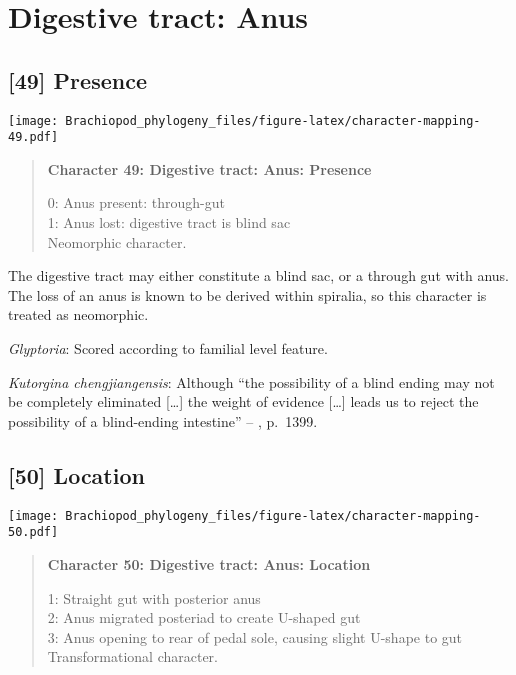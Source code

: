 \documentclass[openany]{book}
\theoremstyle{definition}
\theoremstyle{definition}
\theoremstyle{definition}
\theoremstyle{remark}
\begin{document}
\section{Digestive tract: Anus}\label{digestive-tract-anus}

\subsection*{{[}49{]} Presence}\label{presence-2}

\texttt{[image: Brachiopod\_phylogeny\_files/figure-latex/character-mapping-49.pdf]}

\begin{quote}
\textbf{Character 49: Digestive tract: Anus: Presence}

0: Anus present: through-gut\\
1: Anus lost: digestive tract is blind sac\\
Neomorphic character.
\end{quote}

The digestive tract may either constitute a blind sac, or a through gut
with anus. The loss of an anus is known to be derived within spiralia,
so this character is treated as neomorphic.

\hypertarget{Glyptoria-coding-49}{}
\emph{Glyptoria}: Scored according to familial level feature.

\hypertarget{Kutorgina_chengjiangensis-coding-49}{}
\emph{Kutorgina chengjiangensis}: Although ``the possibility of a blind
ending may not be completely eliminated {[}\ldots{}{]} the weight of
evidence {[}\ldots{}{]} leads us to reject the possibility of a
blind-ending intestine'' --
\citet{Zhang2007Rhynchonelliformeanbrachiopods}, p.~1399.

\subsection*{{[}50{]} Location}\label{location}

\texttt{[image: Brachiopod\_phylogeny\_files/figure-latex/character-mapping-50.pdf]}

\begin{quote}
\textbf{Character 50: Digestive tract: Anus: Location}

1: Straight gut with posterior anus\\
2: Anus migrated posteriad to create U-shaped gut\\
3: Anus opening to rear of pedal sole, causing slight U-shape to gut\\
Transformational character.
\end{quote}
\end{document}
